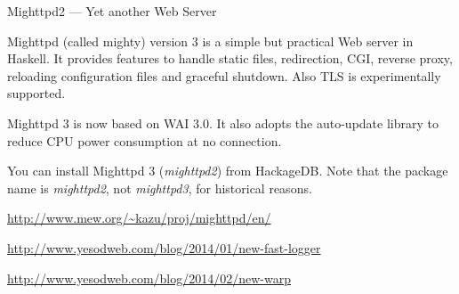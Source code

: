 \begin{hcarentry}[updated]{Mighttpd2 --- Yet another Web Server}
\label{mighttpd2}
\makeheader

Mighttpd (called mighty) version 3 is a simple but practical Web server in Haskell.
It provides features to handle static files, redirection, CGI, reverse proxy, reloading
configuration files and graceful shutdown. Also TLS is experimentally supported.

Mighttpd 3 is now based on WAI 3.0. It also adopts the auto-update
library to reduce CPU power consumption at no connection.

You can install Mighttpd 3 ({\it mighttpd2}) from HackageDB. Note that the package name
is {\it mighttpd2}, not {\it mighttpd3}, for historical reasons.

\FurtherReading
\begin{compactitem}
\item \url{http://www.mew.org/~kazu/proj/mighttpd/en/}
\item \url{http://www.yesodweb.com/blog/2014/01/new-fast-logger}
\item \url{http://www.yesodweb.com/blog/2014/02/new-warp}
\end{compactitem}
\end{hcarentry}
